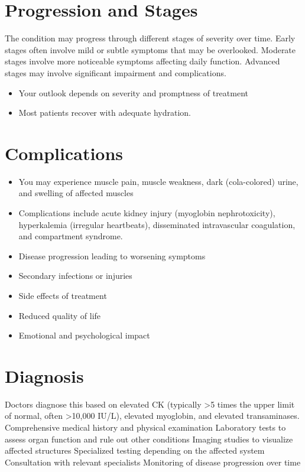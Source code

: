 \section{Progression and Stages}
The condition may progress through different stages of severity over time. Early stages often involve mild or subtle symptoms that may be overlooked. Moderate stages involve more noticeable symptoms affecting daily function. Advanced stages may involve significant impairment and complications.

\begin{itemize}[noitemsep]
  \item Your outlook depends on severity and promptness of treatment
  \item Most patients recover with adequate hydration.
\end{itemize}
\section{Complications}
\begin{itemize}[noitemsep]
  \item You may experience muscle pain, muscle weakness, dark (cola-colored) urine, and swelling of affected muscles
  \item Complications include acute kidney injury (myoglobin nephrotoxicity), hyperkalemia (irregular heartbeats), disseminated intravascular coagulation, and compartment syndrome.
  \item Disease progression leading to worsening symptoms
  \item Secondary infections or injuries
  \item Side effects of treatment
  \item Reduced quality of life
  \item Emotional and psychological impact
\end{itemize}
\section{Diagnosis}
Doctors diagnose this based on elevated CK (typically >5 times the upper limit of normal, often >10,000 IU/L), elevated myoglobin, and elevated transaminases. Comprehensive medical history and physical examination Laboratory tests to assess organ function and rule out other conditions Imaging studies to visualize affected structures Specialized testing depending on the affected system Consultation with relevant specialists Monitoring of disease progression over time

